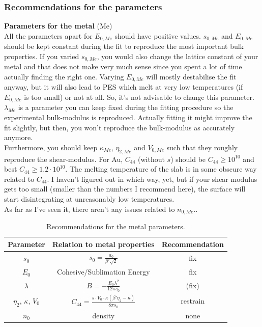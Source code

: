 \documentclass[twoside, 11pt, titlepage, captions=nooneline, a4paper, headsepline]{scrbook}%
\newcommand{\9}{\mathrm}
\newcommand{\0}{\,\mathrm}
\begin{document}
\subsubsection*{Recommendations for the parameters}
\textbf{Parameters for the metal} (Me)\\
All the parameters apart for $E_{0,Me}$ should have positive values.
$s_{0,Me}$ and $E_{0,Me}$ should be kept constant during the fit to reproduce the most important bulk properties. If you varied $s_{0,Me}$, you would also change the lattice constant of your metal and that does not make very much sense since you spent a lot of time actually finding the right one. Varying $E_{0,Me}$ will mostly destabilise the fit anyway, but it will also lead to PES which melt at very low temperatures (if $E_{0,Me}$ is too small) or not at all. So, it's not advisable to change this parameter. $\lambda_{Me}$ is a parameter you can keep fixed during the fitting procedure so the experimental bulk-modulus is reproduced. Actually fitting it might improve the fit slightly, but then, you won't reproduce the bulk-modulus as accurately anymore.\\
Furthermore, you should keep $\kappa_{Me}$, $\eta_{2,Me}$ and $V_{0,Me}$ such that they roughly reproduce the shear-modulus. For Au, $C_{44}$ (without $s$) should be $C_{44} \ge 10^{10}$ and best $C_{44} \ge 1.2 \cdot 10^{10}$. The melting temperature of the slab is in some obscure way related to $C_{44}$. I haven't figured out in which way, yet, but if your shear modulus gets too small (smaller than the numbers I recommend here), the surface will start disintegrating at unreasonably low temperatures.\\
As far as I've seen it, there aren't any issues related to $n_{0,Me}$..\\
\begin{table}[h!]
\centering
\caption{Recommendations for the metal parameters.}
\label{calsusi}
\begin{tabular}{ccc}
\hline\hline
Parameter&Relation to metal properties&Recommendation\\
\hline
$s_0$& $s_0= \frac{a_0}{\beta' \sqrt{2}}$& fix\\
$E_0$& Cohesive/Sublimation Energy& fix\\
$\lambda$&$B = -\frac{E_0 \lambda^2}{12 \pi s_0}$& (fix)\\
$\eta_2$, $\kappa$, $V_0$&$C_{44} = \frac{s\cdot V_0\cdot \kappa (\beta'\eta_2-\kappa)}{8\pi s_0}$& restrain\\
$n_0$& density& none\\
\hline\hline
\end{tabular}
\end{table}
\end{document}
